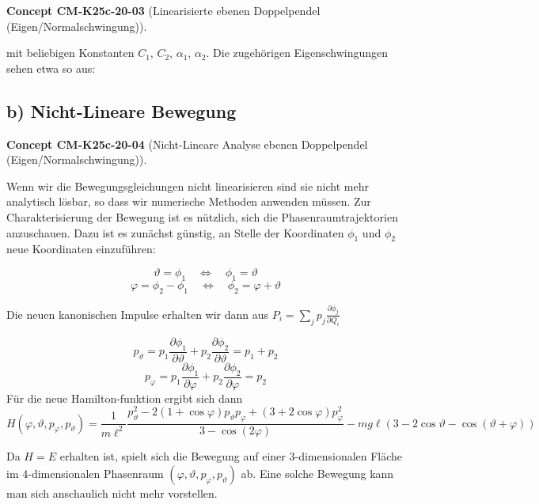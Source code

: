 \documentclass[10pt, letterpaper]{article}
\newcommand{\CustomHeading}[3]{%
  \par\medskip\noindent%
  \textbf{#1 #2} \textnormal{(#3)}.\enskip%
}
\newenvironment{CONC}[2]{\begin{unitbox}\CustomHeading{Concept}{#1}{#2}}{\end{unitbox}}
\begin{document}
\begin{CONC}{CM-K25c-20-03}{Linearisierte ebenen Doppelpendel (Eigen/Normalschwingung)}
mit beliebigen Konstanten $C_1$, $C_2$, $\alpha_1$, $\alpha_2$.
Die zugehörigen Eigenschwingungen sehen etwa so aus:

\begin{center}
\end{center}
\end{CONC}

\subsection*{b) Nicht-Lineare Bewegung}

\begin{CONC}{CM-K25c-20-04}{Nicht-Lineare Analyse ebenen Doppelpendel (Eigen/Normalschwingung)}
Wenn wir die Bewegungsgleichungen nicht linearisieren sind sie nicht mehr analytisch lösbar, so dass wir numerische Methoden anwenden müssen. Zur Charakterisierung der Bewegung ist es nützlich, sich die Phasenraumtrajektorien anzuschauen. Dazu ist es zunächst günstig, an Stelle der Koordinaten $\phi_1$ und $\phi_2$ neue Koordinaten einzuführen:

\[\vartheta = \phi_1 \quad \Leftrightarrow \quad \phi_1 = \vartheta\]
\[\varphi = \phi_2-\phi_1 \quad \Leftrightarrow \quad \phi_2 = \varphi+\vartheta\]

Die neuen kanonischen Impulse erhalten wir dann aus $P_i = \sum_j p_j \frac{\partial \phi_j}{\partial Q_i}$

\[p_\vartheta = p_1 \frac{\partial \phi_1}{\partial \vartheta} + p_2 \frac{\partial \phi_2}{\partial \vartheta} = p_1 + p_2\]
\[p_\varphi = p_1 \frac{\partial \phi_1}{\partial \varphi} + p_2 \frac{\partial \phi_2}{\partial \varphi} = p_2\]
Für die neue Hamilton-funktion ergibt sich dann
\[H(\varphi,\vartheta,p_\varphi,p_\vartheta) = \frac{1}{m\ell^2}\frac{p_\vartheta^2-2(1+\cos\varphi)p_\vartheta p_\varphi+(3+2\cos\varphi)p_\varphi^2}{3-\cos(2\varphi)} - mg\ell(3-2\cos\vartheta-\cos(\vartheta+\varphi))\]

Da $H=E$ erhalten ist, spielt sich die Bewegung auf einer 3-dimensionalen Fläche im 4-dimensionalen Phasenraum $(\varphi,\vartheta,p_\varphi,p_\vartheta)$ ab. Eine solche Bewegung kann man sich anschaulich nicht mehr vorstellen.
\end{CONC}
\end{document}
